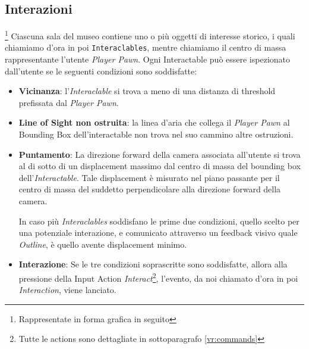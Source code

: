 \documentclass[10pt, openany]{article}
\begin{document}
    \subsection{Interazioni}\footnote{Rappresentate in forma grafica in seguito}
    Ciascuna sala del museo contiene uno o pi\`u oggetti di interesse storico, i quali chiamiamo d'ora in poi \texttt{Interaclables}, mentre chiamiamo 
    il centro di massa rappresentante l'utente \textit{Player Pawn}. Ogni 
    Interactable pu\`o essere ispezionato dall'utente se le seguenti condizioni sono soddisfatte:
    \begin{itemize}[noitemsep, topsep=0pt]
      \item \textbf{Vicinanza}: l'\textit{Interaclable} si trova a meno di una distanza di threshold prefissata dal \textit{Player Pawn}.
      \item \textbf{Line of Sight non ostruita}: la linea d'aria che collega il \textit{Player Pawn} al Bounding Box dell'interactable non trova nel suo 
        cammino altre ostruzioni.
      \item \textbf{Puntamento}: La direzione forward della camera associata all'utente si trova al di sotto di un displacement massimo 
        dal centro di massa del bounding box dell'\textit{Interactable}. Tale displacement \`e misurato nel piano passante per il centro di massa 
        del suddetto perpendicolare alla direzione forward della camera.\par
        In caso pi\`u \textit{Interaclables} soddisfano le prime due condizioni, quello scelto per una potenziale interazione, e comunicato attraverso un 
        feedback visivo quale \textit{Outline}, \`e quello avente displacement minimo.
      \item \textbf{Interazione}: Se le tre condizioni soprascritte sono soddisfatte, allora alla pressione della Input Action
        \textit{Interact}\footnote{Tutte le actions sono dettagliate in sottoparagrafo \ref{vr:commands}}, l'evento, da noi chiamato d'ora in poi \textit{Interaction}, viene lanciato.
    \end{itemize}
\end{document}
